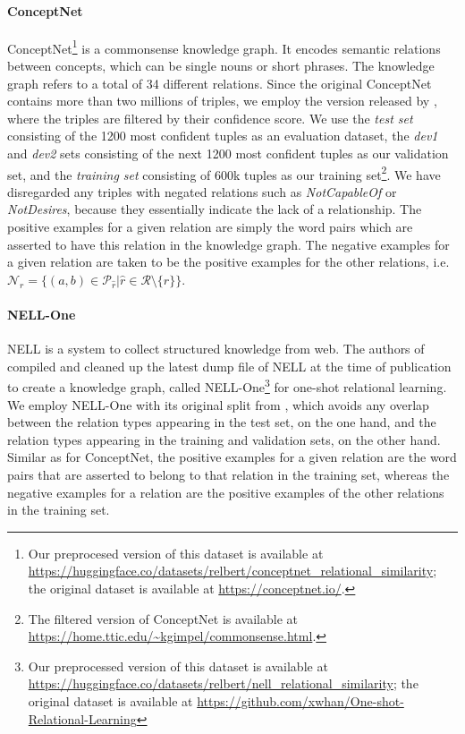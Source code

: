 \documentclass[3p]{elsarticle}
\begin{document}
{\paragraph{ConceptNet}\label{sec:relbert:conceptnet}
ConceptNet\footnote{Our preprocesed version of this dataset is available at \url{https://huggingface.co/datasets/relbert/conceptnet_relational_similarity}; the original dataset is available at \url{https://conceptnet.io/}.} \cite{speer-havasi-2012-representing} is a commonsense knowledge graph. It encodes semantic relations between concepts, which can be single nouns or short phrases. The knowledge graph refers to a total of 34 different relations. Since the original ConceptNet contains more than two millions of triples, we employ the version released by \cite{li-etal-2016-commonsense}, where the triples are filtered by their confidence score. We use the \emph{test set} consisting of the 1200 most confident tuples as an evaluation dataset, the \emph{dev1} and \emph{dev2} sets consisting of the next 1200 most confident tuples as our validation set, and the \emph{training set} consisting of 600k tuples as our training set\footnote{The filtered version of ConceptNet is available at \url{https://home.ttic.edu/~kgimpel/commonsense.html}.}. We have disregarded any triples with negated relations such as \emph{NotCapableOf} or \emph{NotDesires}, because they essentially indicate the lack of a relationship. The positive examples for a given relation are simply the word pairs which are asserted to have this relation in the knowledge graph. The negative examples for a given relation are taken to be the positive examples for the other relations, i.e.\ $\mathcal{N}_r = \{(a,b) \in \mathcal{P}_{\hat{r}} | \hat{r} \in \mathcal{R}\setminus \{r\}\}$.


\paragraph{NELL-One}\label{sec:relbert:nell-one}
NELL \cite{mitchell2018never} is a system to collect structured knowledge from web. The authors of \cite{xiong-etal-2018-one} compiled and cleaned up the latest dump file of NELL at the time of publication to create a knowledge graph, called NELL-One\footnote{Our preprocessed version of this dataset is available at \url{https://huggingface.co/datasets/relbert/nell_relational_similarity}; the original dataset is available at \url{https://github.com/xwhan/One-shot-Relational-Learning}} for one-shot relational learning. We employ NELL-One with its original split from \cite{xiong-etal-2018-one}, which avoids any overlap between the relation types appearing in the test set, on the one hand, and the relation types appearing in the training and validation sets, on the other hand. 
Similar as for ConceptNet, the positive examples for a given relation are the word pairs that are asserted to belong to that relation in the training set, whereas the negative examples for a relation are the positive examples of the other relations in the training set.

}
\end{document}
